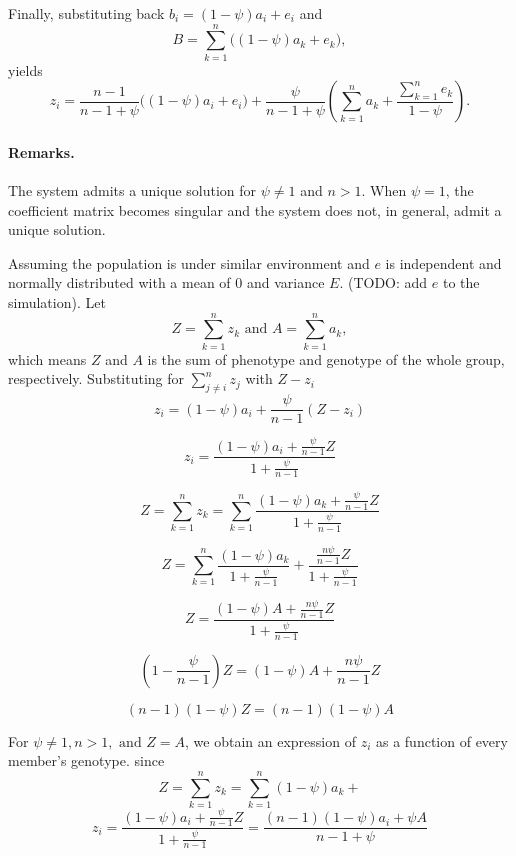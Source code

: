 Finally, substituting back $b_i = (1-\psi)a_i + e_i$ and 
\[
B = \sum_{k=1}^n \big((1-\psi)a_k + e_k\big),
\]
yields
\begin{equation}
z_i
=
\frac{n-1}{n-1+\psi}\big((1-\psi)a_i + e_i\big)
+
\frac{\psi}{n-1+\psi}
\left(
\sum_{k=1}^n a_k
+
\frac{\sum_{k=1}^n e_k}{1-\psi}
\right).
\label{eq:final_solution}
\end{equation}

\paragraph{Remarks.}
The system admits a unique solution for $\psi \ne 1$ and $n>1$.  
When $\psi = 1$, the coefficient matrix becomes singular and the system does not, in general, admit a unique solution.


Assuming the population is under similar environment and $e$ is independent and normally distributed with a mean of 0 and variance $E$. (TODO: add $e$ to the simulation). Let $$Z=\sum^n_{k=1}z_k\text{ and }A=\sum^n_{k=1}a_k,$$ which means $Z$ and $A$ is the sum of phenotype and genotype of the whole group, respectively. Substituting for $\sum^n_{j\neq i} z_j$ with $Z-z_i$
\begin{equation}
    z_i=(1-\psi)a_i+\frac{\psi}{n-1}(Z-z_i)
\end{equation}

\begin{equation}
    z_i=\frac{(1-\psi)a_i+\frac{\psi}{n-1}Z}{1+\frac{\psi}{n-1}}
\end{equation}

\begin{equation}
    Z=\sum^n_{k=1}z_k=\sum^n_{k=1}\frac{(1-\psi)a_k+\frac{\psi}{n-1}Z}{1+\frac{\psi}{n-1}}
\end{equation}

\begin{equation}
    Z=\sum^n_{k=1}\frac{(1-\psi)a_k}{1+\frac{\psi}{n-1}}+\frac{\frac{n\psi}{n-1}Z}{1+\frac{\psi}{n-1}}
\end{equation}

\begin{equation}
    Z=\frac{(1-\psi)A+\frac{n\psi}{n-1}Z}{1+\frac{\psi}{n-1}}
\end{equation}

\begin{equation}
    (1-\frac{\psi}{n-1})Z=(1-\psi)A+\frac{n\psi}{n-1}Z
\end{equation}

\begin{equation}
    (n-1)(1-\psi)Z=(n-1)(1-\psi)A
\end{equation}

For $\psi\neq 1, n>1, \text{ and }Z=A$, we obtain an expression of $z_i$ as a function of every member's genotype. 
 since $$Z=\sum^n_{k=1}z_k=\sum^n_{k=1}(1-\psi)a_k+$$
\begin{equation}
    z_i=\frac{(1-\psi)a_i+\frac{\psi}{n-1}Z}{1+\frac{\psi}{n-1}}=\frac{(n-1)(1-\psi)a_i+\psi A}{n-1+\psi}
\end{equation}
